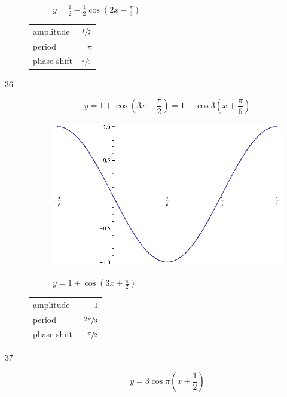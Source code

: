 \documentclass{exam}
\begin{document}
\begin{description}
\begin{figure}[H]
          $y = \frac{1}{2} - \frac{1}{2} \cos \left( 2x - \frac{\pi}{3} \right)$
        \end{figure}

        \begin{tabular}[H]{lr}
          \toprule
          amplitude   & $\sfrac{1}{2}$ \\
          period      & $\pi$ \\
          phase shift & $\sfrac{\pi}{6}$ \\
          \bottomrule
        \end{tabular}

      \pagebreak

      \item[36]
        \[
          y = 1 + \cos \left( 3x + \frac{\pi}{2} \right) = 1 + \cos 3 \left( x + \frac{\pi}{6} \right)
        \]

        \begin{figure}[H]
          \centering
          \includegraphics[scale=1.0]{exercise36.eps}

          $y = 1 + \cos \left( 3x + \frac{\pi}{2} \right)$
        \end{figure}

        \begin{tabular}[H]{lr}
          \toprule
          amplitude   & $1$ \\
          period      & $\sfrac{2 \pi}{3}$ \\
          phase shift & $- \sfrac{\pi}{2}$ \\
          \bottomrule
        \end{tabular}

      \pagebreak

      \item[37]
        \[
          y = 3 \cos \pi \left( x + \frac{1}{2} \right) 
        \]


\end{description}
\end{document}
